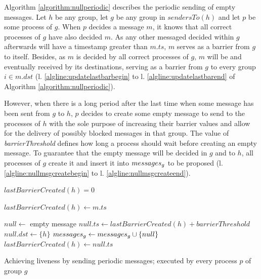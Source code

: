 \documentclass[times, 10pt]{article}
\begin{document}
Algorithm \ref{algorithm:nullperiodic} describes the periodic sending of empty messages. Let $h$ be any group, let $g$ be any group in $sendersTo(h)$ and let $p$ be some process of $g$. When $p$ decides a message $m$, it knows that all correct processes of $g$ have also decided $m$. As any other messaged decided within $g$ afterwards will have a timestamp greater than $m.ts$, $m$ serves as a barrier from $g$ to itself. Besides, as $m$ is decided by all correct processes of $g$, $m$ will be \rmcast{} and eventually received by its destinations, serving as a barrier from $g$ to every group $i \in m.dst$ (l. \ref{algline:updatelastbarbegin} to l. \ref{algline:updatelastbarend} of Algorithm \ref{algorithm:nullperiodic}).

However, when there is a long period after the last time when some message has been sent from $g$ to $h$, $p$ decides to create some empty message to send to the processes of $h$ with the sole purpose of increasing their barrier values and allow for the delivery of possibly blocked messages in that group. The value of \mbox{\textit{barrierThreshold}} defines how long a process should wait before creating an empty message. To guarantee that the empty message will be decided in $g$ and \rmcast{} to $h$, all processes of $g$ create it and insert it into $messages\text{$_g$}$ to be proposed (l. \ref{algline:nullmsgcreatebegin} to l. \ref{algline:nullmsgcreateend}).

\begin{algorithm}
\begin{distribalgo}[1]
\blankline
{}
    \STATE $lastBarrierCreated(h) = 0$
  \ENDINDENT
\ENDINDENT

\blankline
{} \label{algline:updatelastbarbegin}
    \STATE $lastBarrierCreated(h) \leftarrow m.ts$ \label{algline:updatelastbarend}
  \ENDINDENT  
\ENDINDENT

\blankline
{} \label{algline:nullmsgcreatebegin}
  \STATE $null \leftarrow$ empty message
  \STATE $null.ts \leftarrow lastBarrierCreated(h) + barrierThreshold$ \label{algline:samenullid}
  \STATE $null.dst \leftarrow \{h\}$ 
  \STATE $messages\text{$_g$} \leftarrow messages\text{$_g$} \cup \{null\}$ \label{algline:enqnull}
  \STATE $lastBarrierCreated(h) \leftarrow null.ts$ \label{algline:nullmsgcreateend}
\ENDINDENT 

\blankline
\caption{Achieving liveness by sending periodic messages; executed by every process $p$ of group $g$}
\label{algorithm:nullperiodic}
\end{distribalgo} 
\end{algorithm}
\end{document}
